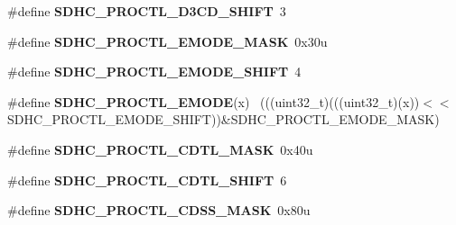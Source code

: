 \begin{DoxyCompactItemize}
\item 
\hypertarget{group___s_d_h_c___register___masks_ga9bd9fc5a38a643e4a04f03026a18e55a}{}\#define {\bfseries S\+D\+H\+C\+\_\+\+P\+R\+O\+C\+T\+L\+\_\+\+D3\+C\+D\+\_\+\+S\+H\+I\+F\+T}~3\label{group___s_d_h_c___register___masks_ga9bd9fc5a38a643e4a04f03026a18e55a}

\item 
\hypertarget{group___s_d_h_c___register___masks_ga18ccde546ac8eb940360a8ff3671723b}{}\#define {\bfseries S\+D\+H\+C\+\_\+\+P\+R\+O\+C\+T\+L\+\_\+\+E\+M\+O\+D\+E\+\_\+\+M\+A\+S\+K}~0x30u\label{group___s_d_h_c___register___masks_ga18ccde546ac8eb940360a8ff3671723b}

\item 
\hypertarget{group___s_d_h_c___register___masks_gaf41ed2806a975210d570ee34cfe81630}{}\#define {\bfseries S\+D\+H\+C\+\_\+\+P\+R\+O\+C\+T\+L\+\_\+\+E\+M\+O\+D\+E\+\_\+\+S\+H\+I\+F\+T}~4\label{group___s_d_h_c___register___masks_gaf41ed2806a975210d570ee34cfe81630}

\item 
\hypertarget{group___s_d_h_c___register___masks_ga587577b42aeeaabd4765441e98d135e4}{}\#define {\bfseries S\+D\+H\+C\+\_\+\+P\+R\+O\+C\+T\+L\+\_\+\+E\+M\+O\+D\+E}(x)                                      ~(((uint32\+\_\+t)(((uint32\+\_\+t)(x))$<$$<$S\+D\+H\+C\+\_\+\+P\+R\+O\+C\+T\+L\+\_\+\+E\+M\+O\+D\+E\+\_\+\+S\+H\+I\+F\+T))\&S\+D\+H\+C\+\_\+\+P\+R\+O\+C\+T\+L\+\_\+\+E\+M\+O\+D\+E\+\_\+\+M\+A\+S\+K)\label{group___s_d_h_c___register___masks_ga587577b42aeeaabd4765441e98d135e4}

\item 
\hypertarget{group___s_d_h_c___register___masks_ga8af505ec10166a4196541f055cad8907}{}\#define {\bfseries S\+D\+H\+C\+\_\+\+P\+R\+O\+C\+T\+L\+\_\+\+C\+D\+T\+L\+\_\+\+M\+A\+S\+K}~0x40u\label{group___s_d_h_c___register___masks_ga8af505ec10166a4196541f055cad8907}

\item 
\hypertarget{group___s_d_h_c___register___masks_ga84652338a2704314d7ab2381a351215c}{}\#define {\bfseries S\+D\+H\+C\+\_\+\+P\+R\+O\+C\+T\+L\+\_\+\+C\+D\+T\+L\+\_\+\+S\+H\+I\+F\+T}~6\label{group___s_d_h_c___register___masks_ga84652338a2704314d7ab2381a351215c}

\item 
\hypertarget{group___s_d_h_c___register___masks_ga4eacd6fff47090ff277ac702744032c7}{}\#define {\bfseries S\+D\+H\+C\+\_\+\+P\+R\+O\+C\+T\+L\+\_\+\+C\+D\+S\+S\+\_\+\+M\+A\+S\+K}~0x80u\label{group___s_d_h_c___register___masks_ga4eacd6fff47090ff277ac702744032c7}


\end{DoxyCompactItemize}
